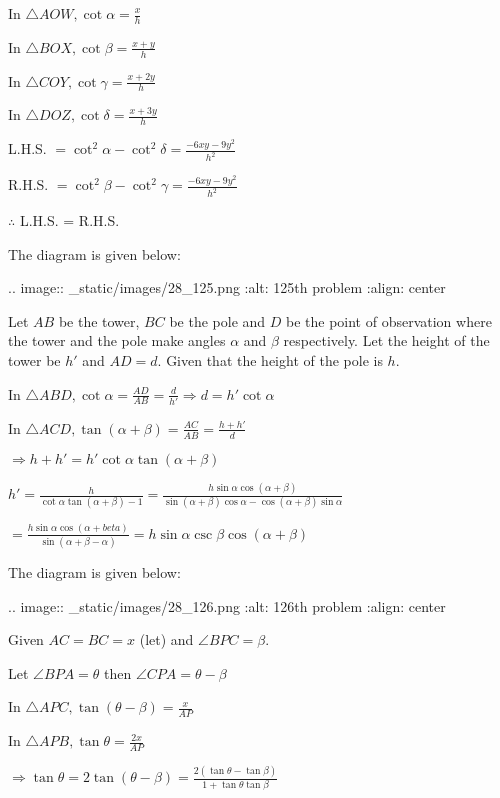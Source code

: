   In $\triangle AOW, \cot\alpha = \frac{x}{h}$

  In $\triangle BOX, \cot\beta = \frac{x + y}{h}$

  In $\triangle COY, \cot\gamma = \frac{x + 2y}{h}$

  In $\triangle DOZ, \cot\delta = \frac{x + 3y}{h}$

  L.H.S. $= \cot^2\alpha - \cot^2\delta = \frac{-6xy - 9y^2}{h^2}$

  R.H.S. $= \cot^2\beta - \cot^2\gamma = \frac{-6xy - 9y^2}{h^2}$

  $\therefore$ L.H.S. = R.H.S.

\item The diagram is given below:

  .. image:: _static/images/28_125.png
  :alt: 125th problem
  :align: center

  Let $AB$ be the tower, $BC$ be the pole and $D$ be the point of observation where the
  tower and the pole make angles $\alpha$ and $\beta$ respectively. Let the height of the
  tower be $h'$ and $AD = d$. Given that the height of the pole is $h$.

  In $\triangle ABD, \cot\alpha = \frac{AD}{AB} = \frac{d}{h'} \Rightarrow d = h'\cot\alpha$

  In $\triangle ACD, \tan(\alpha + \beta) = \frac{AC}{AB} = \frac{h + h'}{d}$

  $\Rightarrow h + h' = h'\cot\alpha\tan(\alpha + \beta)$

  $h' = \frac{h}{\cot\alpha\tan(\alpha + \beta) - 1} = \frac{h\sin\alpha\cos(\alpha +
    \beta)}{\sin(\alpha + \beta)\cos\alpha - \cos(\alpha + \beta)\sin\alpha}$

  $= \frac{h\sin\alpha\cos(\alpha + beta)}{\sin(\alpha + \beta - \alpha)} =
  h\sin\alpha\csc\beta\cos(\alpha + \beta)$

\item The diagram is given below:

  .. image:: _static/images/28_126.png
  :alt: 126th problem
  :align: center

  Given $AC = BC = x$ (let) and $\angle BPC = \beta$.

  Let $\angle BPA = \theta$ then $\angle CPA = \theta - \beta$

  In $\triangle APC, \tan(\theta - \beta) = \frac{x}{AP}$

  In $\triangle APB, \tan\theta = \frac{2x}{AP}$

  $\Rightarrow \tan\theta = 2\tan(\theta - \beta) = \frac{2(\tan\theta - \tan\beta)}{1 +
    \tan\theta\tan\beta}$

